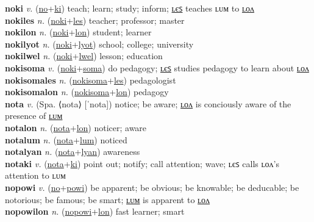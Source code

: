 \textbf{noki} \textit{v.} (\hyperref[no]{no}+\hyperref[ki]{ki})
teach; learn; study; inform; \hyperref[nokiles]{ʟєꜱ} teaches ʟᴜᴍ to \hyperref[nokilon]{ʟᴏᴧ} \label{noki} \\
\textbf{nokiles} \textit{n.} (\hyperref[noki]{noki}+\hyperref[les]{les})
teacher; professor; master \label{nokiles} \\
\textbf{nokilon} \textit{n.} (\hyperref[noki]{noki}+\hyperref[lon]{lon})
student; learner \label{nokilon} \\
\textbf{nokilyot} \textit{n.} (\hyperref[noki]{noki}+\hyperref[lyot]{lyot})
school; college; university \label{nokilyot} \\
\textbf{nokilwel} \textit{n.} (\hyperref[noki]{noki}+\hyperref[lwel]{lwel})
lesson; education \label{nokilwel} \\
\textbf{nokisoma} \textit{v.} (\hyperref[noki]{noki}+\hyperref[soma]{soma})
do pedagogy; \hyperref[nokisomales]{ʟєꜱ} studies pedagogy to learn about \hyperref[nokisomalon]{ʟᴏᴧ} \label{nokisoma} \\
\textbf{nokisomales} \textit{n.} (\hyperref[nokisoma]{nokisoma}+\hyperref[les]{les})
pedagologist \label{nokisomales} \\
\textbf{nokisomalon} \textit{n.} (\hyperref[nokisoma]{nokisoma}+\hyperref[lon]{lon})
pedagogy \label{nokisomalon} \\
\textbf{nota} \textit{v.} (Spa. ⟨nota⟩ [ˈnota])
notice; be aware; \hyperref[notalon]{ʟᴏᴧ} is conciously aware of the presence of \hyperref[notalum]{ʟᴜᴍ} \label{nota} \\
\textbf{notalon} \textit{n.} (\hyperref[nota]{nota}+\hyperref[lon]{lon})
noticer; aware \label{notalon} \\
\textbf{notalum} \textit{n.} (\hyperref[nota]{nota}+\hyperref[lum]{lum})
noticed \label{notalum} \\
\textbf{notalyan} \textit{n.} (\hyperref[nota]{nota}+\hyperref[lyan]{lyan})
awareness \label{notalyan} \\
\textbf{notaki} \textit{v.} (\hyperref[nota]{nota}+\hyperref[ki]{ki})
point out; notify; call attention; wave; ʟєꜱ calls ʟᴏᴧ’s attention to ʟᴜᴍ \label{notaki} \\
\textbf{nopowi} \textit{v.} (\hyperref[no]{no}+\hyperref[powi]{powi})
be apparent; be obvious; be knowable; be deducable; be notorious; be famous; be smart; \hyperref[nopowilum]{ʟᴜᴍ} is apparent to \hyperref[nopowilon]{ʟᴏᴧ} \label{nopowi} \\
\textbf{nopowilon} \textit{n.} (\hyperref[nopowi]{nopowi}+\hyperref[lon]{lon})
fast learner; smart \label{nopowilon} \\
